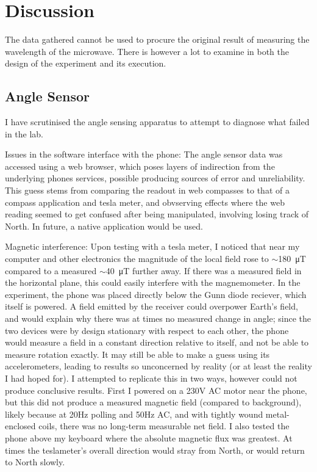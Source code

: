 \section*{Discussion}

The data gathered cannot be used to procure the original result of measuring the wavelength of the microwave. There is however a lot to examine in both the design of the experiment and its execution.

\subsection*{Angle Sensor}

I have scrutinised the angle sensing apparatus to attempt to diagnose what failed in the lab.

Issues in the software interface with the phone:
The angle sensor data was accessed using a web browser, which poses layers of indirection from the underlying phones services, possible producing sources of error and unreliability. This guess stems from comparing the readout in web compasses to that of a compass application and tesla meter, and obvserving effects where the web reading seemed to get confused after being manipulated, involving losing track of North. In future, a native application would be used.

Magnetic interference:
Upon testing with a tesla meter, I noticed that near my computer and other electronics the magnitude of the local field rose to 
$\sim$\SI{180}{\micro\tesla} compared to a measured $\sim$\SI{40}{\micro\tesla} further away. If there was a measured field in the horizontal plane, this could easily interfere with the magnemometer. In the experiment, the phone was placed directly below the Gunn diode reciever, which itself is powered. A field emitted by the receiver could overpower Earth's field, and would explain why there was at times no measured change in angle; since the two devices were by design stationary with respect to each other, the phone would measure a field in a constant direction relative to itself, and not be able to measure rotation exactly. It may still be able to make a guess using its accelerometers, leading to results so unconcerned by reality (or at least the reality I had hoped for).
I attempted to replicate this in two ways, however could not produce conclusive results. First I powered on a 230V AC motor near the phone, but this did not produce a measured magnetic field (compared to background), likely because at 20Hz polling and 50Hz AC, and with tightly wound metal-enclosed coils, there was no long-term measurable net field. I also tested the phone above my keyboard where the absolute magnetic flux was greatest. At times the teslameter's overall direction would stray from North, or would return to North slowly. 

